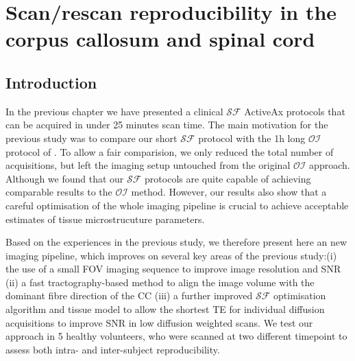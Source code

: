 \newcommand{\SF}{{\ensuremath{\mathcal{SF}}}}
\newcommand{\OI}{{\ensuremath{\mathcal{OI}}}}
\newcommand{\SD}{{\ensuremath{\mathcal{SF}_{pulses}}}}
\newcommand{\DO}{{\ensuremath{\mathcal{SF}_{dirs}}}}
\newcommand{\FD}{{\SF}}
\newcommand{\FDmod}{{\ensuremath{\FD_{mod}}}}
\newcommand{\SFasym}{{\ensuremath{a\mathcal{SF}}}}

\newcommand{\SFshort}{\SF$_{90}$}
\newcommand{\SFlong}{\SF$_{360}$}
\newcommand{\OIlong}{\OI$_{360}$}


\newsavebox{\poorBox}
\savebox{\poorBox}{\textcolor{red}{\rule{0.05in}{0.05in}}}
\newsavebox{\fairBox}
\savebox{\fairBox}{\textcolor{orange}{\rule{0.05in}{0.05in}}}
\newsavebox{\moderateBox}
\savebox{\moderateBox}{\textcolor{yellow}{\rule{0.05in}{0.05in}}}
\newsavebox{\substantialBox}
\savebox{\substantialBox}{\textcolor{lime}{\rule{0.05in}{0.05in}}}
\newsavebox{\perfectBox}
\savebox{\perfectBox}{\textcolor{green}{\rule{0.05in}{0.05in}}}


\chapter[Scan/rescan in the corpus callosum]{Scan/rescan reproducibility in the corpus callosum and spinal cord}
\section{Introduction}
In the previous chapter we have presented a clinical {\SF} ActiveAx protocols that can be acquired in under 25 minutes scan time. The main motivation for the previous study was to compare our short {\SF} protocol with the 1h long \OI{} protocol of \citep{Alexander:2010}. To allow a fair comparision, we only reduced the total number of acquisitions, but left the imaging setup untouched from the original \OI{} approach. Although we found that our \SF{} protocols are quite capable of achieving comparable results to the \OI{} method. However, our results also show that a careful optimisation of the whole imaging pipeline is crucial to achieve acceptable estimates of tissue microstrucuture parameters. 


Based on the experiences in the previous study, we therefore present here an new imaging pipeline, which improves on several key areas of the previous study:(i) the use of a small \gls{FOV} imaging sequence to improve image resolution and SNR  (ii) a fast tractography-based method to align the image volume with the dominant fibre direction of the CC (iii) a further improved \SF{} optimisation algorithm and tissue model to allow the shortest \gls{TE} for individual diffusion acquisitions to improve SNR in low diffusion weighted scans.  We test our approach in 5 healthy volunteers, who were scanned at two different timepoint to assess both intra- and inter-subject reproducibility. 
